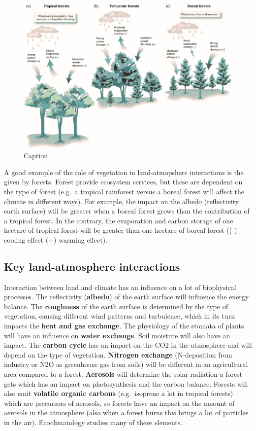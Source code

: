 \documentclass[12pt,oneside]{book}
\begin{document}
\begin{figure}

{\centering \includegraphics[width=0.8\linewidth]{figures/Figure110} 

}

\caption{Caption}\label{fig:Biogeoscience2}
\end{figure}

A good example of the role of vegetation in land-atmopshere interactions
is the given by forests. Forest provide ecosystem services, but these
are dependent on the type of forest (e.g.~a tropical rainforest versus a
boreal forest will affect the climate in different ways). For example,
the impact on the albedo (reflectivity earth surface) will be greater
when a boreal forest grows than the contribution of a tropical forest.
In the contrary, the evaporation and carbon storage of one hectare of
tropical forest will be greater than one hectare of boreal forest ((-)
cooling effect (+) warming effect).

\subsection{Key land-atmosphere
interactions}\label{key-land-atmosphere-interactions}

Interaction between land and climate has an influence on a lot of
biophysical processes. The reflectivity (\textbf{albedo}) of the earth
surface will influence the energy balance. The \textbf{roughness} of the
earth surface is determined by the type of vegetation, causing different
wind patterns and turbulence, which in its turn impacts the \textbf{heat
and gas exchange}. The physiology of the stomata of plants will have an
influence on \textbf{water exchange}. Soil moisture will also have an
impact. The \textbf{carbon cycle} has an impact on the CO2 in the
atmosphere and will depend on the type of vegetation. \textbf{Nitrogen
exchange} (N-deposition from industry or N2O as greenhouse gas from
soils) will be different in an agricultural area compared to a forest.
\textbf{Aerosols} will determine the solar radiation a forest gets which
has an impact on photosynthesis and the carbon balance. Forests will
also emit \textbf{volatile organic carbons} (e.g.~isoprene a lot in
tropical forests) which are precursors of aerosols, so forests have an
impact on the amount of aerosols in the atmosphere (also when a forest
burns this brings a lot of particles in the air). Ecoclimatology studies
many of these elements.
\end{document}
